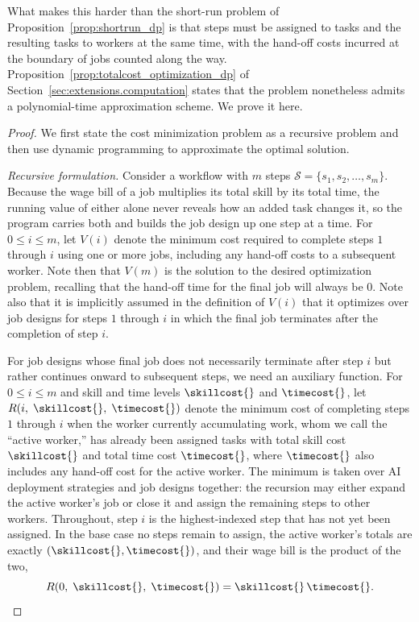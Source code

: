 What makes this harder than the short-run problem of Proposition~\ref{prop:shortrun_dp} is that steps must be assigned to tasks and the resulting tasks to workers at the same time, with the hand-off costs incurred at the boundary of jobs counted along the way.
Proposition~\ref{prop:totalcost_optimization_dp} of Section~\ref{sec:extensions.computation} states that the problem nonetheless admits a polynomial-time approximation scheme.
We prove it here.

\begin{proof}
We first state the cost minimization problem as a recursive problem and then use dynamic programming to approximate the optimal solution.

\emph{Recursive formulation.}
Consider a workflow with $m$ steps $\mathcal{S} = \{s_1, s_2, \ldots, s_m\}$.
Because the wage bill of a job multiplies its total skill by its total time, the running value of either alone never reveals how an added task changes it, so the program carries both and builds the job design up one step at a time.
For $0 \leq i \leq m$, let $V(i)$ denote the minimum cost required to complete steps $1$ through $i$ using one or more jobs, including any hand-off costs to a subsequent worker.
Note then that $V(m)$ is the solution to the desired optimization problem, recalling that the hand-off time for the final job will always be $0$.
Note also that it is implicitly assumed in the definition of $V(i)$ that it optimizes over job designs for steps $1$ through $i$ in which the final job terminates after the completion of step $i$.

For job designs whose final job does not necessarily terminate after step $i$ but rather continues onward to subsequent steps, we need an auxiliary function.
For $0 \leq i \leq m$ and skill and time levels $\skillcost{}$ and $\timecost{}$, let $R(i,\; \skillcost{},\; \timecost{})$ denote the minimum cost of completing steps $1$ through $i$ when the worker currently accumulating work, whom we call the ``active worker,'' has already been assigned tasks with total skill cost $\skillcost{}$ and total time cost $\timecost{}$, where $\timecost{}$ also includes any hand-off cost for the active worker.
The minimum is taken over AI deployment strategies and job designs together: the recursion may either expand the active worker's job or close it and assign the remaining steps to other workers.
Throughout, step $i$ is the highest-indexed step that has not yet been assigned.
In the base case no steps remain to assign, the active worker's totals are exactly $(\skillcost{}, \timecost{})$, and their wage bill is the product of the two,
\[ R(0,\; \skillcost{},\; \timecost{}) = \skillcost{}\,\timecost{}. \]


\end{proof}
